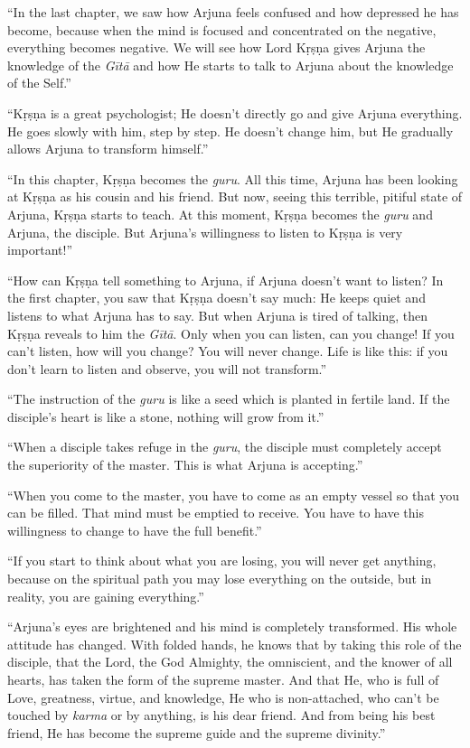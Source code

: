 \documentclass[12pt, twoside, openright]{memoir}
\begin{document}
\enquote{In the last chapter, we saw how Arjuna feels confused and how depressed he has become, because when the mind is focused and concentrated on the negative, everything becomes negative. We will see how Lord Kṛṣṇa gives Arjuna the knowledge of the \textit{Gītā} and how He starts to talk to Arjuna about the knowledge of the Self.}

\enquote{Kṛṣṇa is a great psychologist; He doesn’t directly go and give Arjuna everything. He goes slowly with him, step by step. He doesn’t change him, but He gradually allows Arjuna to transform himself.}

\enquote{In this chapter, Kṛṣṇa becomes the \textit{guru}. All this time, Arjuna has been looking at Kṛṣṇa as his cousin and his friend. But now, seeing this terrible, pitiful state of Arjuna, Kṛṣṇa starts to teach. At this moment, Kṛṣṇa becomes the \textit{guru} and Arjuna, the disciple. But Arjuna’s willingness to listen to Kṛṣṇa is very important!}

\enquote{How can Kṛṣṇa tell something to Arjuna, if Arjuna doesn’t want to listen? In the first chapter, you saw that Kṛṣṇa doesn’t say much: He keeps quiet and listens to what Arjuna has to say. But when Arjuna is tired of talking, then Kṛṣṇa reveals to him the \textit{Gītā}. Only when you can listen, can you change! If you can’t listen, how will you change? You will never change. Life is like this: if you don’t learn to listen and observe, you will not transform.}

\enquote{The instruction of the \textit{guru} is like a seed which is planted in fertile land. If the disciple’s heart is like a stone, nothing will grow from it.}

\enquote{When a disciple takes refuge in the \textit{guru}, the disciple must completely accept the superiority of the master. This is what Arjuna is accepting.}

\enquote{When you come to the master, you have to come as an empty vessel so that you can be filled. That mind must be emptied to receive. You have to have this willingness to change to have the full benefit.}

\enquote{If you start to think about what you are losing, you will never get anything, because on the spiritual path you may lose everything on the outside, but in reality, you are gaining everything.}

\enquote{Arjuna’s eyes are brightened and his mind is completely transformed. His whole attitude has changed. With folded hands, he knows that by taking this role of the disciple, that the Lord, the God Almighty, the omniscient, and the knower of all hearts, has taken the form of the supreme master. And that He, who is full of Love, greatness, virtue, and knowledge, He who is non-attached, who can’t be touched by \textit{karma} or by anything, is his dear friend. And from being his best friend, He has become the supreme guide and the supreme divinity.}
\end{document}

